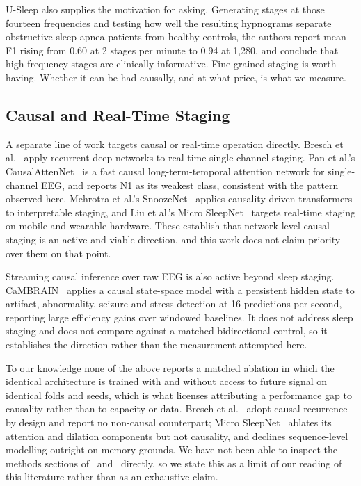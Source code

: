 \documentclass[conference]{IEEEtran}
\begin{document}
U-Sleep also supplies the motivation for asking. Generating stages at those fourteen
frequencies and testing how well the resulting hypnograms separate obstructive sleep apnea
patients from healthy controls, the authors report mean F1 rising from 0.60 at 2 stages per
minute to 0.94 at 1{,}280, and conclude that high-frequency stages are clinically
informative. Fine-grained staging is worth having. Whether it can be had causally, and at
what price, is what we measure.

\subsection{Causal and Real-Time Staging}

A separate line of work targets causal or real-time operation directly. Bresch et
al.~\cite{bresch} apply recurrent deep networks to real-time single-channel staging. Pan et
al.'s CausalAttenNet~\cite{causalattennet} is a fast causal long-term-temporal attention
network for single-channel EEG, and reports N1 as its weakest class, consistent with the
pattern observed here. Mehrotra et al.'s SnoozeNet~\cite{snoozenet} applies causality-driven
transformers to interpretable staging, and Liu et al.'s Micro SleepNet~\cite{microsleepnet}
targets real-time staging on mobile and wearable hardware. These establish that
network-level causal staging is an active and viable direction, and this work does not claim
priority over them on that point.

Streaming causal inference over raw EEG is also active beyond sleep staging.
CaMBRAIN~\cite{cambrain} applies a causal state-space model with a persistent hidden state to
artifact, abnormality, seizure and stress detection at 16 predictions per second, reporting
large efficiency gains over windowed baselines. It does not address sleep staging and does
not compare against a matched bidirectional control, so it establishes the direction rather
than the measurement attempted here.

To our knowledge none of the above reports a matched ablation in which the identical
architecture is trained with and without access to future signal on identical folds and
seeds, which is what licenses attributing a performance gap to causality rather than to
capacity or data. Bresch et al.~\cite{bresch} adopt causal recurrence by design and report
no non-causal counterpart; Micro SleepNet~\cite{microsleepnet} ablates its attention and
dilation components but not causality, and declines sequence-level modelling outright on
memory grounds. We have not been able to inspect the methods sections
of~\cite{causalattennet} and~\cite{snoozenet} directly, so we state this as a limit of our
reading of this literature rather than as an exhaustive claim.
\end{document}
